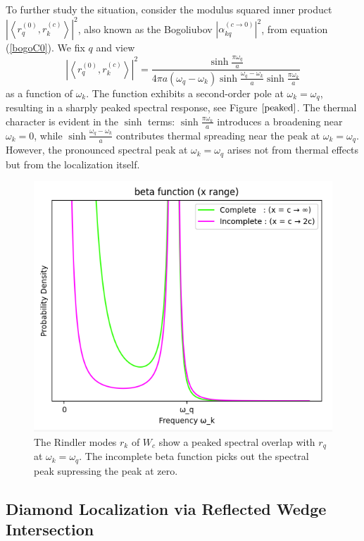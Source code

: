 \documentclass[12pt,a4paper]{article}
\begin{document}
To further study the situation, consider the modulus squared inner product $\left|\left<r_q^{(0)}, r_k^{(c)} \right>\right|^2$, also known as the Bogoliubov $\left|\alpha^{(c \rightarrow 0)}_{kq}\right|^2$, from equation (\ref{bogoC0}).  We fix $q$ and view
\begin{equation}
  \left|\left<r_q^{(0)}, r_k^{(c)} \right>\right|^2 = \frac{\sinh \frac{\pi \omega_q}{a}}{4\pi a (\omega_q - \omega_k) \sinh \frac{\omega_q - \omega_k}{a} \sinh \frac{\pi \omega_k}{a}}
\end{equation}
as a function of $\omega_k$. The function exhibits a second-order pole at $\omega_k = \omega_q$, resulting in a sharply peaked spectral response, see Figure $\ref{peaked}$. The thermal character is evident in the $\sinh$ terms: $\sinh \frac{\pi \omega_k}{a}$ introduces a broadening near $\omega_k = 0$, while $\sinh \frac{\omega_q - \omega_k}{a}$ contributes thermal spreading near the peak at $\omega_k = \omega_q$. However, the pronounced spectral peak at $\omega_k = \omega_q$ arises not from thermal effects but from the localization itself.

\begin{figure}[h]
  \centering
\includegraphics[scale=0.6]{peaked.png}
\caption{The Rindler modes $r_k$ of $W_c$ show a peaked spectral overlap with $r_q$ at $\omega_k = \omega_q$. The incomplete beta function picks out the spectral peak supressing the peak at zero.}
\label{peaked}
\end{figure}

\subsection{Diamond Localization via Reflected Wedge Intersection}
\end{document}
